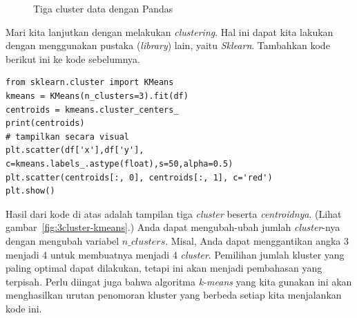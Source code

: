 \begin{figure}[ht]
   \caption{Tiga cluster data dengan Pandas}
   \label{fig:3cluster}
\end{figure}

Mari kita lanjutkan dengan melakukan {\em clustering}.
Hal ini dapat kita lakukan dengan menggunakan pustaka ({\em library})
lain, yaitu {\em Sklearn}.
Tambahkan kode berikut ini ke kode sebelumnya.

\begin{verbatim}
from sklearn.cluster import KMeans
kmeans = KMeans(n_clusters=3).fit(df)
centroids = kmeans.cluster_centers_
print(centroids)
# tampilkan secara visual
plt.scatter(df['x'],df['y'], c=kmeans.labels_.astype(float),s=50,alpha=0.5)
plt.scatter(centroids[:, 0], centroids[:, 1], c='red')
plt.show()
\end{verbatim}

Hasil dari kode di atas adalah tampilan tiga {\em cluster}
beserta {\em centroidnya}.
(Lihat gambar~\ref{fig:3cluster-kmeans}.)
Anda dapat mengubah-ubah jumlah {\em cluster}-nya dengan mengubah
variabel $n\_clusters$. Misal, Anda dapat menggantikan angka 3 menjadi 4
untuk membuatnya menjadi 4 {\em cluster}.
Pemilihan jumlah kluster yang paling optimal dapat dilakukan, tetapi
ini akan menjadi pembahasan yang terpisah.
Perlu diingat juga bahwa algoritma {\em k-means} yang kita gunakan ini
akan menghasilkan urutan penomoran kluster yang berbeda
setiap kita menjalankan kode ini.

